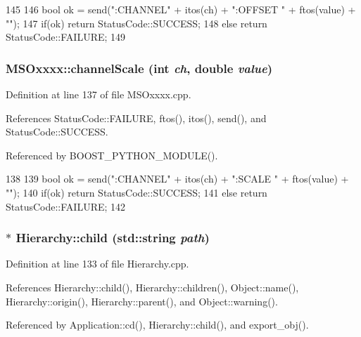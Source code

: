 \begin{DoxyCode}
145 {
146     bool ok = send(":CHANNEL" + itos(ch) + ":OFFSET " + ftos(value) + "\n");
147     if(ok)  return StatusCode::SUCCESS;
148     else        return StatusCode::FAILURE;
149 }
\end{DoxyCode}
\hypertarget{classMSOxxxx_ae08131dd88d4d7f95e870b69b2f5e0e6}{
\subsubsection[{channelScale}]{ MSOxxxx::channelScale (int {\em ch}, \/  double {\em value})}}
\label{classMSOxxxx_ae08131dd88d4d7f95e870b69b2f5e0e6}


Definition at line 137 of file MSOxxxx.cpp.

References StatusCode::FAILURE, ftos(), itos(), send(), and StatusCode::SUCCESS.

Referenced by BOOST\_\-PYTHON\_\-MODULE().


\begin{DoxyCode}
138 {
139     bool ok = send(":CHANNEL" + itos(ch) + ":SCALE " + ftos(value) + "\n");
140     if(ok)  return StatusCode::SUCCESS;
141     else        return StatusCode::FAILURE;
142 }
\end{DoxyCode}
\hypertarget{classHierarchy_a1e207f973c694b538bf90107b4868817}{
\subsubsection[{child}]{ $\ast$ Hierarchy::child (std::string {\em path})}}
\label{classHierarchy_a1e207f973c694b538bf90107b4868817}


Definition at line 133 of file Hierarchy.cpp.

References Hierarchy::child(), Hierarchy::children(), Object::name(), Hierarchy::origin(), Hierarchy::parent(), and Object::warning().

Referenced by Application::cd(), Hierarchy::child(), and export\_\-obj().


